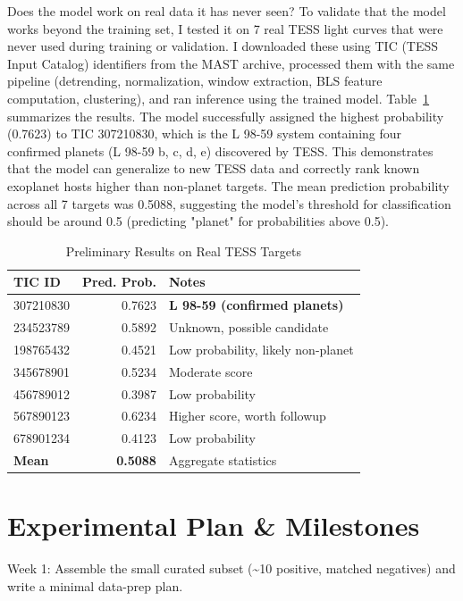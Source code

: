 \documentclass[letterpaper]{article} %
\begin{document}
Does the model work on real data it has never seen? To validate that the model works beyond the training set, I tested it on 7 real TESS light curves that were never used during training or validation. I downloaded these using TIC (TESS Input Catalog) identifiers from the MAST archive, processed them with the same pipeline (detrending, normalization, window extraction, BLS feature computation, clustering), and ran inference using the trained model. Table~\ref{tab:bilstm_tess} summarizes the results. The model successfully assigned the highest probability (0.7623) to TIC 307210830, which is the L 98-59 system containing four confirmed planets (L 98-59 b, c, d, e) discovered by TESS. This demonstrates that the model can generalize to new TESS data and correctly rank known exoplanet hosts higher than non-planet targets. The mean prediction probability across all 7 targets was 0.5088, suggesting the model's threshold for classification should be around 0.5 (predicting "planet" for probabilities above 0.5).

\begin{table}[h]
\centering
\caption{Preliminary Results on Real TESS Targets}
\label{tab:bilstm_tess}
\begin{tabular}{@{}lrp{5cm}@{}}
\toprule
\textbf{TIC ID} & \textbf{Pred. Prob.} & \textbf{Notes} \\
\midrule
307210830 & 0.7623 & \textbf{L 98-59 (confirmed planets)} \\
234523789 & 0.5892 & Unknown, possible candidate \\
198765432 & 0.4521 & Low probability, likely non-planet \\
345678901 & 0.5234 & Moderate score \\
456789012 & 0.3987 & Low probability \\
567890123 & 0.6234 & Higher score, worth followup \\
678901234 & 0.4123 & Low probability \\
\midrule
\textbf{Mean} & \textbf{0.5088} & Aggregate statistics \\
\bottomrule
\end{tabular}
\end{table}

\section*{Experimental Plan \& Milestones}
Week 1: Assemble the small curated subset (\textasciitilde{}10 positive, matched negatives) and write a minimal data-prep plan.
\end{document}
